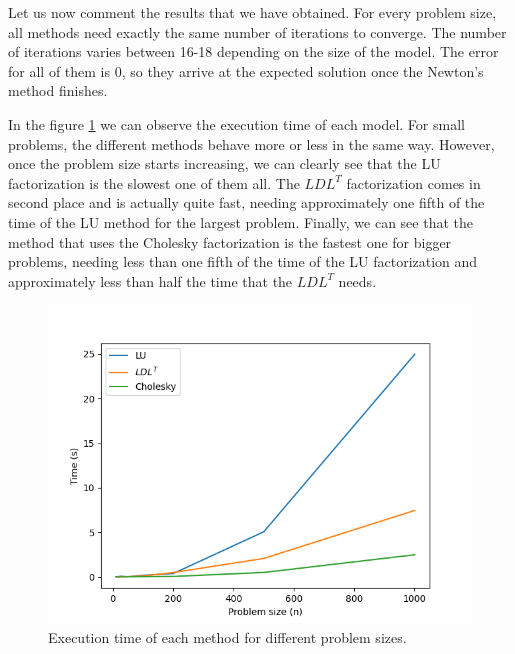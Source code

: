 \documentclass[11pt,a4paper]{article}
\begin{document}
Let us now comment the results that we have obtained. For every problem size, all methods need exactly
the same number of iterations to converge. The number of iterations varies between 16-18 depending on the
size of the model. The error for all of them is 0, so they arrive at the expected solution once the
Newton's method finishes.

In the figure \ref{fig:execution-time} we can observe the execution time of each model. For small problems,
the different methods behave more or less in the same way. However, once the problem size starts increasing,
we can clearly see that the LU factorization is the slowest one of them all. The  $LDL^T$ factorization
comes in second place and is actually quite fast, needing approximately one fifth of the time of the LU method
for the largest problem. Finally, we can see that the method that uses the Cholesky factorization is the
fastest one for bigger problems, needing less than one fifth of the time of the LU factorization and approximately
less than half the time that the $LDL^T$ needs.

\begin{figure}[H]
  \centering
  \includegraphics[scale=0.6]{img/inequality_times}
  \caption{Execution time of each method for different problem sizes.}
  \label{fig:execution-time}
\end{figure}
\end{document}
